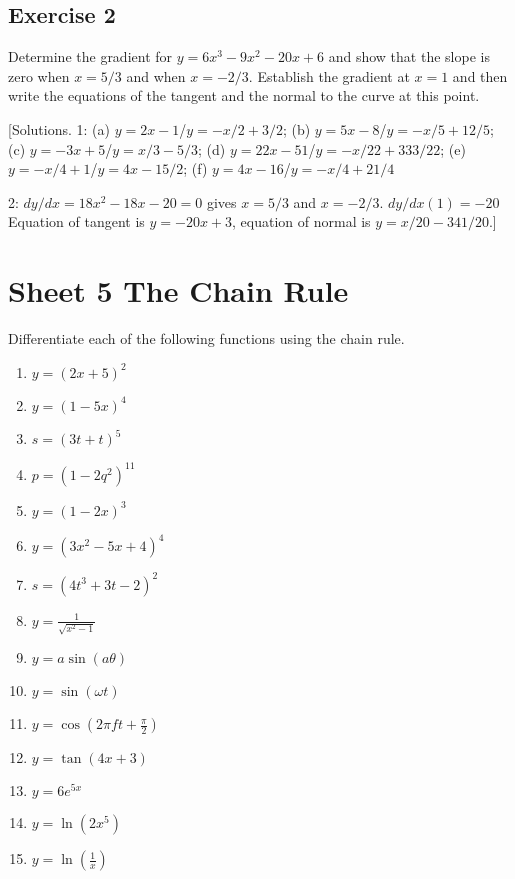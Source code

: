 \documentclass[
  11pt,
  oneside]{book}
\providecommand{\tightlist}{%
  \setlength{\itemsep}{0pt}\setlength{\parskip}{0pt}}
\newcommand{\slide}{}
\theoremstyle{definition}
\theoremstyle{definition}
\theoremstyle{definition}
\theoremstyle{definition}
\theoremstyle{remark}
\begin{document}
\slide

\subsection*{Exercise 2}\label{exercise-2-1}

Determine the gradient for \(y=6x^3-9x^2-20x+6\) and show that the slope is zero when \(x=5/3\) and when \(x=-2/3\). Establish the gradient at \(x=1\) and then write the equations of the tangent and the normal to the curve at this point.

\slide

{[}Solutions. 1: (a) \(y=2x-1\)/\(y=-x/2+3/2\); (b) \(y=5x-8\)/\(y=-x/5+12/5\); (c) \(y=-3x+5\)/\(y=x/3-5/3\); (d) \(y=22x-51\)/\(y=-x/22+333/22\); (e) \(y=-x/4+1\)/\(y=4x-15/2\); (f) \(y=4x-16\)/\(y=-x/4+21/4\)

2: \(dy/dx = 18x^2-18x-20 = 0\) gives \(x=5/3\) and \(x=-2/3\). \(dy/dx(1) = -20\) Equation of tangent is \(y=-20x+3\), equation of normal is \(y=x/20-341/20\).{]}

\slide

\section{Sheet 5 The Chain Rule}\label{sheet-5-the-chain-rule}

Differentiate each of the following functions using the chain rule.

\begin{enumerate}
\def\labelenumi{\arabic{enumi}.}
\tightlist
\item
  \(y=(2x+5)^2\)
\item
  \(y=(1-5x)^4\)
\item
  \(s=(3t+t)^5\)
\item
  \(p=(1-2q^2)^{11}\)
\item
  \(y=(1-2x)^3\)
\item
  \(y=(3x^2-5x+4)^4\)
\item
  \(s=(4t^3+3t-2)^2\)
\item
  \(y=\frac1{\sqrt{x^2-1}}\)
\item
  \(y=a\sin(a\theta)\)
\item
  \(y=\sin(\omega t)\)
\item
  \(y=\cos(2\pi ft+\frac{\pi}2)\)
\item
  \(y=\tan(4x+3)\)
\item
  \(y=6e^{5x}\)
\item
  \(y=\ln(2x^5)\)
\item
  \(y=\ln(\frac 1x)\)
\end{enumerate}
\end{document}
